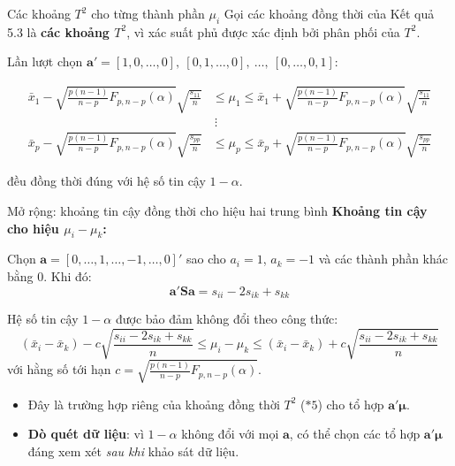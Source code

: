 \begin{frame}{Các khoảng $T^2$ cho từng thành phần $\mu_i$}
Gọi các khoảng đồng thời của Kết quả 5.3 là \textbf{các khoảng $T^2$}, vì xác
suất phủ được xác định bởi phân phối của $T^2$.

Lần lượt chọn $\mathbf a'=[1,0,\ldots,0],\ [0,1,\ldots,0],\ \ldots,\ [0,\ldots,0,1]$:

\begin{keyformula}
{\footnotesize
\begin{equation*}
\tag{5-24}
\begin{aligned}
\bar x_1-\sqrt{\tfrac{p(n-1)}{n-p}F_{p,n-p}(\alpha)}\sqrt{\tfrac{s_{11}}{n}}
&\le \mu_1\le
\bar x_1+\sqrt{\tfrac{p(n-1)}{n-p}F_{p,n-p}(\alpha)}\sqrt{\tfrac{s_{11}}{n}}\\
&\ \vdots\\
\bar x_p-\sqrt{\tfrac{p(n-1)}{n-p}F_{p,n-p}(\alpha)}\sqrt{\tfrac{s_{pp}}{n}}
&\le \mu_p\le
\bar x_p+\sqrt{\tfrac{p(n-1)}{n-p}F_{p,n-p}(\alpha)}\sqrt{\tfrac{s_{pp}}{n}}
\end{aligned}
\end{equation*}}
\end{keyformula}

đều đồng thời đúng với hệ số tin cậy $1-\alpha$.
\end{frame}

\begin{frame}{Mở rộng: khoảng tin cậy đồng thời cho hiệu hai trung bình}
  \textbf{Khoảng tin cậy cho hiệu $\mu_i - \mu_k$:}
  
  Chọn $\mathbf{a} = [0, \dots, 1, \dots, -1, \dots, 0]'$ sao cho $a_i = 1$, $a_k = -1$ và các thành phần khác bằng $0$. Khi đó:
  \[
    \mathbf{a}'\mathbf{S}\mathbf{a} = s_{ii} - 2s_{ik} + s_{kk}
  \]
  
  \vspace{-0.5em}
  Hệ số tin cậy $1-\alpha$ được bảo đảm không đổi theo công thức:
  \begin{equation*}
    (\bar{x}_i - \bar{x}_k) - c \sqrt{\frac{s_{ii} - 2s_{ik} + s_{kk}}{n}}
    \le \mu_i - \mu_k \le
    (\bar{x}_i - \bar{x}_k) + c \sqrt{\frac{s_{ii} - 2s_{ik} + s_{kk}}{n}}
    \tag{5-25}
  \end{equation*}
  với hằng số tới hạn $c = \sqrt{\frac{p(n-1)}{n-p} F_{p,n-p}(\alpha)}$.

  \begin{itemize}
    \item Đây là trường hợp riêng của khoảng đồng thời $T^2$ ($*5$) cho tổ hợp $\mathbf{a}'\boldsymbol{\mu}$.
    \item \textbf{Dò quét dữ liệu}: vì $1-\alpha$ không đổi với mọi $\mathbf{a}$, có thể chọn các tổ hợp $\mathbf{a}'\boldsymbol{\mu}$ đáng xem xét \emph{sau khi} khảo sát dữ liệu.
  \end{itemize}
\end{frame}

